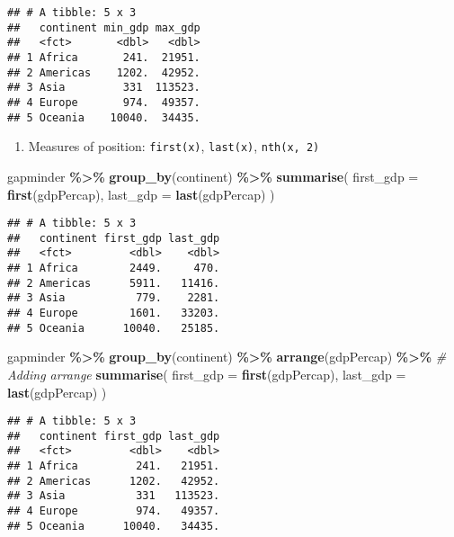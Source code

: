 \documentclass[
]{book}
\newenvironment{Shaded}{\begin{snugshade}}{\end{snugshade}}
\newcommand{\CommentTok}[1]{\textcolor[rgb]{0.56,0.35,0.01}{\textit{#1}}}
\newcommand{\DataTypeTok}[1]{\textcolor[rgb]{0.13,0.29,0.53}{#1}}
\newcommand{\KeywordTok}[1]{\textcolor[rgb]{0.13,0.29,0.53}{\textbf{#1}}}
\newcommand{\NormalTok}[1]{#1}
\newcommand{\OperatorTok}[1]{\textcolor[rgb]{0.81,0.36,0.00}{\textbf{#1}}}
\newcommand{\StringTok}[1]{\textcolor[rgb]{0.31,0.60,0.02}{#1}}
\providecommand{\tightlist}{%
  \setlength{\itemsep}{0pt}\setlength{\parskip}{0pt}}
\begin{document}
\begin{verbatim}
## # A tibble: 5 x 3
##   continent min_gdp max_gdp
##   <fct>       <dbl>   <dbl>
## 1 Africa       241.  21951.
## 2 Americas    1202.  42952.
## 3 Asia         331  113523.
## 4 Europe       974.  49357.
## 5 Oceania    10040.  34435.
\end{verbatim}

\begin{enumerate}
\def\labelenumi{\arabic{enumi}.}
\setcounter{enumi}{2}
\tightlist
\item
  Measures of position: \texttt{first(x)}, \texttt{last(x)}, \texttt{nth(x,\ 2)}
\end{enumerate}

\begin{Shaded}
\begin{Highlighting}[]
\NormalTok{gapminder }\OperatorTok{\%\textgreater{}\%}
\StringTok{  }\KeywordTok{group\_by}\NormalTok{(continent) }\OperatorTok{\%\textgreater{}\%}
\StringTok{  }\KeywordTok{summarise}\NormalTok{(}
    \DataTypeTok{first\_gdp =} \KeywordTok{first}\NormalTok{(gdpPercap),}
    \DataTypeTok{last\_gdp =} \KeywordTok{last}\NormalTok{(gdpPercap)}
\NormalTok{  )}
\end{Highlighting}
\end{Shaded}

\begin{verbatim}
## # A tibble: 5 x 3
##   continent first_gdp last_gdp
##   <fct>         <dbl>    <dbl>
## 1 Africa        2449.     470.
## 2 Americas      5911.   11416.
## 3 Asia           779.    2281.
## 4 Europe        1601.   33203.
## 5 Oceania      10040.   25185.
\end{verbatim}

\begin{Shaded}
\begin{Highlighting}[]
\NormalTok{gapminder }\OperatorTok{\%\textgreater{}\%}
\StringTok{  }\KeywordTok{group\_by}\NormalTok{(continent) }\OperatorTok{\%\textgreater{}\%}
\StringTok{  }\KeywordTok{arrange}\NormalTok{(gdpPercap) }\OperatorTok{\%\textgreater{}\%}\StringTok{ }\CommentTok{\# Adding arrange}
\StringTok{  }\KeywordTok{summarise}\NormalTok{(}
    \DataTypeTok{first\_gdp =} \KeywordTok{first}\NormalTok{(gdpPercap),}
    \DataTypeTok{last\_gdp =} \KeywordTok{last}\NormalTok{(gdpPercap)}
\NormalTok{  )}
\end{Highlighting}
\end{Shaded}

\begin{verbatim}
## # A tibble: 5 x 3
##   continent first_gdp last_gdp
##   <fct>         <dbl>    <dbl>
## 1 Africa         241.   21951.
## 2 Americas      1202.   42952.
## 3 Asia           331   113523.
## 4 Europe         974.   49357.
## 5 Oceania      10040.   34435.
\end{verbatim}
\end{document}
